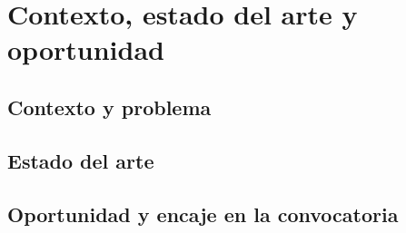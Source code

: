 \section{Contexto, estado del arte y oportunidad}

\subsection{Contexto y problema}

\subsection{Estado del arte}

\subsection{Oportunidad y encaje en la convocatoria}
